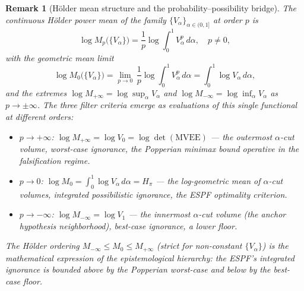 \documentclass[12pt]{article}
\newtheorem{remark}[theorem]{Remark}
\begin{document}
\begin{remark}[H\"{o}lder mean structure and the probability--possibility bridge]
\label{rem:holder}
The continuous H\"{o}lder power mean of the family $\{V_\alpha\}_{\alpha \in (0,1]}$ at order $p$ is
\begin{equation}
\log M_p\bigl(\{V_\alpha\}\bigr) = \frac{1}{p}\log\int_0^1 V_\alpha^p\,d\alpha, \quad p \neq 0,
\end{equation}
with the geometric mean limit
\begin{equation}
\log M_0\bigl(\{V_\alpha\}\bigr) = \lim_{p\to 0}\,\frac{1}{p}\log\int_0^1 V_\alpha^p\,d\alpha = \int_0^1 \log V_\alpha\,d\alpha,
\end{equation}
and the extremes $\log M_{+\infty} = \log\sup_\alpha V_\alpha$ and $\log M_{-\infty} = \log\inf_\alpha V_\alpha$ as $p \to \pm\infty$. The three filter criteria emerge as evaluations of this single functional at different orders:
\begin{itemize}
\item $p \to +\infty$: $\log M_{+\infty} = \log V_0 = \log\det(\mathrm{MVEE})$ --- the outermost $\alpha$-cut volume, worst-case ignorance, the Popperian minimax bound operative in the falsification regime.
\item $p \to 0$: $\log M_0 = \int_0^1 \log V_\alpha\,d\alpha = H_\pi$ --- the log-geometric mean of $\alpha$-cut volumes, integrated possibilistic ignorance, the ESPF optimality criterion.
\item $p \to -\infty$: $\log M_{-\infty} = \log V_1$ --- the innermost $\alpha$-cut volume (the anchor hypothesis neighborhood), best-case ignorance, a lower floor.
\end{itemize}
The H\"{o}lder ordering $M_{-\infty} \leq M_0 \leq M_{+\infty}$ (strict for non-constant $\{V_\alpha\}$) is the mathematical expression of the epistemological hierarchy: the ESPF's integrated ignorance is bounded above by the Popperian worst-case and below by the best-case floor.


\end{remark}
\end{document}
